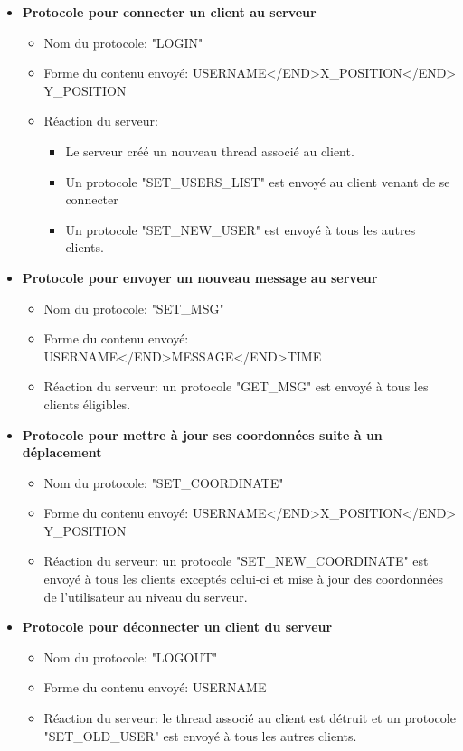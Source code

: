 \documentclass[a4paper,12pt]{report}
\begin{document}
    \begin{itemize}
      \item \textbf{Protocole pour connecter un client au serveur}
        \begin{itemize}
          \item Nom du protocole: "LOGIN"
          \item Forme du contenu envoyé: USERNAME</END>X\_POSITION</END>\\Y\_POSITION
          \item Réaction du serveur:
            \begin{itemize}
              \item Le serveur créé un nouveau thread associé au client.
              \item Un protocole "SET\_USERS\_LIST" est envoyé au client venant de se connecter
              \item Un protocole "SET\_NEW\_USER" est envoyé à tous les autres clients.
            \end{itemize}
        \end{itemize}
      \item \textbf{Protocole pour envoyer un nouveau message au serveur}
        \begin{itemize}
          \item Nom du protocole: "SET\_MSG"
          \item Forme du contenu envoyé: USERNAME</END>MESSAGE</END>TIME
          \item Réaction du serveur: un protocole "GET\_MSG" est envoyé à tous les clients éligibles.
        \end{itemize}
      \item \textbf{Protocole pour mettre à jour ses coordonnées suite à un déplacement}
        \begin{itemize}
          \item Nom du protocole: "SET\_COORDINATE"
          \item Forme du contenu envoyé: USERNAME</END>X\_POSITION</END>\\Y\_POSITION
          \item Réaction du serveur: un protocole "SET\_NEW\_COORDINATE" est envoyé à tous les clients exceptés celui-ci et mise à jour des coordonnées de l'utilisateur au niveau du serveur.
        \end{itemize}
      \item \textbf{Protocole pour déconnecter un client du serveur}
        \begin{itemize}
          \item Nom du protocole: "LOGOUT"
          \item Forme du contenu envoyé: USERNAME
          \item Réaction du serveur: le thread associé au client est détruit et un protocole "SET\_OLD\_USER" est envoyé à tous les autres clients.
        \end{itemize}
    \end{itemize}
\end{document}
